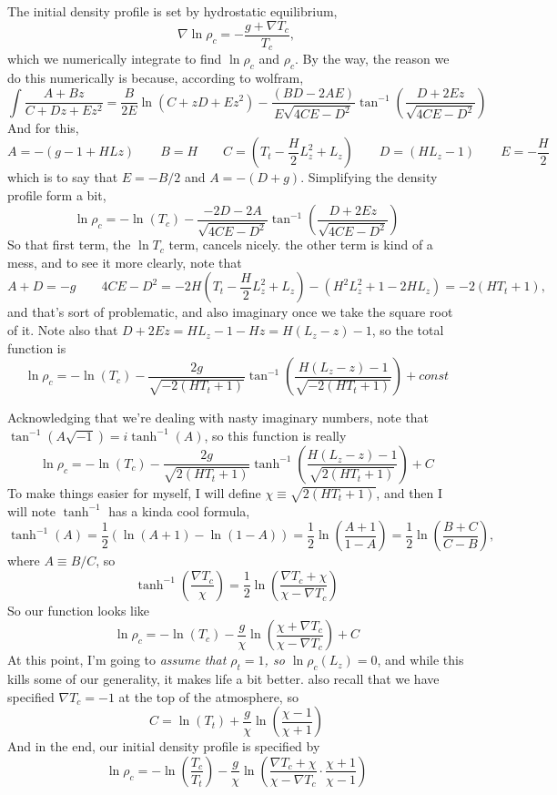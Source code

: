 \documentclass[aps, pre, onecolumn, nofootinbib, notitlepage, groupedaddress, amsfonts, amssymb, amsmath, longbibliography]{revtex4-1}
\newcommand{\grad}{\ensuremath{\nabla}}
\begin{document}
The initial density profile is set by hydrostatic equilibrium,
\begin{equation}
\grad\ln\rho_c = -\frac{g + \grad T_c}{T_c},
\end{equation}
which we numerically integrate to find $\ln\rho_c$ and $\rho_c$.  By the way, the reason
we do this numerically is because, according to wolfram,
$$
\int\frac{A + Bz}{C + Dz + Ez^2} = \frac{B}{2E}\ln\left(C + zD + Ez^2\right)
- \frac{(BD - 2AE)}{E\sqrt{4CE - D^2}}\tan^{-1}\left(\frac{D + 2 Ez}{\sqrt{4CE - D^2}}\right)
$$
And for this,
$$
A = -\left(g - 1 + HLz\right)\qquad B = H \qquad C = \left(T_t - \frac{H}{2}L_z^2 + L_z\right)
\qquad D = (HL_z - 1) \qquad E = -\frac{H}{2}
$$
which is to say that $E = -B/2$ and $A = -(D + g)$.  Simplifying the density profile
form a bit,
$$
\ln\rho_c = -\ln(T_c) - \frac{-2D - 2A}{\sqrt{4CE - D^2}}\tan^{-1}\left(\frac{D + 2Ez}{\sqrt{4CE - D^2}}\right)
$$
So that first term, the $\ln T_c$ term, cancels nicely.  the other term is kind of a mess, and to see
it more clearly, note that
$$
A + D = -g \qquad 4CE - D^2 = -2H\left(T_t - \frac{H}{2}L_z^2 + L_z\right) - (H^2 L_z^2 + 1 - 2HL_z)
= - 2(HT_t + 1),
$$
and that's sort of problematic, and also imaginary once we take the square root of it.  Note also
that $D + 2Ez = HL_z - 1 - Hz = H(L_z - z) - 1$, so the total function is
$$
\ln\rho_c = -\ln(T_c) - \frac{2g}{\sqrt{-2(HT_t + 1)}}\tan^{-1}\left(\frac{H(L_z - z) - 1}{\sqrt{-2(HT_t + 1)}}\right)
+ const
$$

Acknowledging that we're dealing with nasty imaginary numbers, note that $\tan^{-1}(A\sqrt{-1}) = i \tanh^{-1}(A)$,
so this function is really
\begin{equation}
\ln\rho_c = -\ln(T_c) - \frac{2g}{\sqrt{2(HT_t + 1)}}\tanh^{-1}\left(\frac{H(L_z - z) - 1}{\sqrt{2(H T_t + 1)}}\right) + C
\end{equation}
To make things easier for myself, I will define $\chi \equiv \sqrt{2(HT_t + 1)}$, and then I will note
$\tanh^{-1}$ has a kinda cool formula,
$$
\tanh^{-1}(A) = \frac{1}{2}\left(\ln(A + 1) - \ln(1 - A)\right) = \frac{1}{2}\ln\left(\frac{A + 1}{1 - A}\right)
= \frac{1}{2}\ln\left(\frac{B + C}{C - B}\right),
$$
where $A \equiv B / C$, so
$$
\tanh^{-1}\left(\frac{\grad T_c}{\chi}\right) =
\frac{1}{2}\ln\left(\frac{\grad T_c + \chi}{\chi - \grad T_c}\right)
$$
So our function looks like
\begin{equation}
\ln\rho_c = -\ln(T_c) - \frac{g}{\chi}\ln\left(\frac{\chi + \grad T_c}{\chi - \grad T_c}\right) + C
\end{equation}
At this point, I'm going to \emph{assume that $\rho_t = 1$, so $\ln\rho_c(L_z) = 0$}, and while
this kills some of our generality, it makes life a bit better.  also recall that we
have specified $\grad T_c = -1$ at the top of the atmosphere, so
$$
C = \ln(T_t) + \frac{g}{\chi}\ln\left(\frac{\chi - 1}{\chi + 1}\right)
$$
And in the end, our initial density profile is specified by
\begin{equation}
\ln\rho_c = -\ln\left(\frac{T_c}{T_t}\right) - \frac{g}{\chi}\ln\left(
\frac{\grad T_c + \chi}{\chi- \grad T_c}\cdot
\frac{\chi + 1}{\chi - 1}
\right)
\end{equation}
\end{document}
